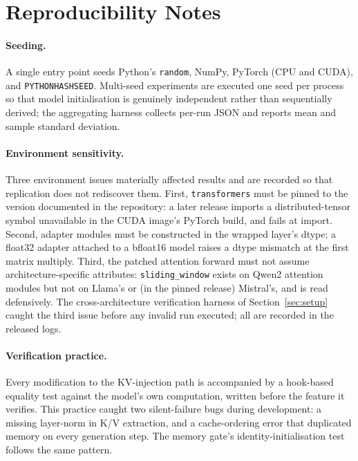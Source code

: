 \section{Reproducibility Notes}
\label{app:repro}

\paragraph{Seeding.} A single entry point seeds Python's \texttt{random}, NumPy, PyTorch (CPU and CUDA), and \texttt{PYTHONHASHSEED}. Multi-seed experiments are executed one seed per process so that model initialisation is genuinely independent rather than sequentially derived; the aggregating harness collects per-run JSON and reports mean and sample standard deviation.

\paragraph{Environment sensitivity.} Three environment issues materially affected results and are recorded so that replication does not rediscover them. First, \texttt{transformers} must be pinned to the version documented in the repository: a later release imports a distributed-tensor symbol unavailable in the CUDA image's PyTorch build, and fails at import. Second, adapter modules must be constructed in the wrapped layer's dtype; a float32 adapter attached to a bfloat16 model raises a dtype mismatch at the first matrix multiply. Third, the patched attention forward must not assume architecture-specific attributes: \texttt{sliding\_window} exists on Qwen2 attention modules but not on Llama's or (in the pinned release) Mistral's, and is read defensively. The cross-architecture verification harness of Section~\ref{sec:setup} caught the third issue before any invalid run executed; all are recorded in the released logs.

\paragraph{Verification practice.} Every modification to the KV-injection path is accompanied by a hook-based equality test against the model's own computation, written before the feature it verifies. This practice caught two silent-failure bugs during development: a missing layer-norm in K/V extraction, and a cache-ordering error that duplicated memory on every generation step. The memory gate's identity-initialisation test follows the same pattern.
